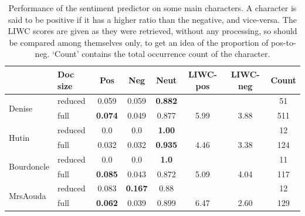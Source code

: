 \begin{table}
\centerfloat
\begin{tabular}{| l | l || *{6}{c|}}
\hline
& Doc size & Pos & Neg	& Neut & LIWC-pos & LIWC-neg & Count	\\ \hline \hline
\multirow{2}{*}{Denise} & reduced & 0.059 & 0.059 & \bf 0.882 & & & 51 \\ \cline{2-8}
& full & \bf 0.074 & 0.049 & 0.877	& 5.99 & 3.88 & 511 	\\ \hline

\multirow{2}{*}{Hutin} & reduced & 0.0	& 0.0 & \bf 1.00 & & & 12 \\ \cline{2-8}
& full & 0.032 & 0.032 & \bf 0.935	& 4.46 & 3.38 & 124	\\ \hline
    
\multirow{2}{*}{Bourdoncle}	& reduced & 0.0	& 0.0 & \bf 1.0 & & & 11 \\ \cline{2-8}
	& full & \bf 0.085 & 0.043 & 0.872 & 5.09 & 4.04 & 117 \\ \hline
    
\multirow{2}{*}{MrsAouda} & reduced	& 0.083	& \bf 0.167	&  0.88 & & &  12 \\ \cline{2-8}
	& full & \bf 0.062 & 0.039 & 0.899 & 6.47 & 2.60 & 129 \\ \hline

\end{tabular}

\caption{Performance of the sentiment predictor on some main characters. A character is said to be positive if it has a higher ratio than the negative, and vice-versa. The LIWC scores are given as they were retrieved, without any processing, so should be compared among themselves only, to get an idea of the proportion of pos-to-neg. `Count' contains the total occurrence count of the character.}
\label{tab:full_vs_red}
\end{table}



\vspace{3em}

